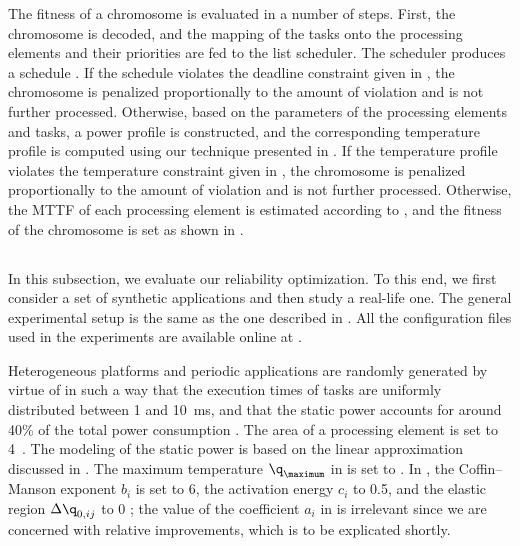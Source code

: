 The fitness of a chromosome is evaluated in a number of steps. First, the
chromosome is decoded, and the mapping of the tasks onto the processing elements
and their priorities are fed to the list scheduler. The scheduler produces a
schedule \schedule. If the schedule violates the deadline constraint given in
, the chromosome is penalized proportionally
to the amount of violation and is not further processed. Otherwise, based on the
parameters of the processing elements and tasks, a power profile \mp is
constructed, and the corresponding temperature profile \mq is computed using our
technique presented in . If the temperature
profile violates the temperature constraint given in
, the chromosome is penalized proportionally
to the amount of violation and is not further processed. Otherwise, the
\ac{MTTF} of each processing element is estimated according to
, and the fitness of the chromosome is set as
shown in .

\subsection{\resultstitle}

In this subsection, we evaluate our reliability optimization. To this end, we
first consider a set of synthetic applications and then study a real-life one.
The general experimental setup is the same as the one described in
. All the configuration files used in the
experiments are available online at \cite{eslab2012}.

Heterogeneous platforms and periodic applications are randomly generated by
virtue of  \cite{dick1998} in such a way that the execution times of
tasks are uniformly distributed between 1 and 10~ms, and that the static power
accounts for around 40\% of the total power consumption \cite{liu2007}. The area
of a processing element is set to 4~. The modeling of the static
power is based on the linear approximation discussed in
. The maximum temperature $\q_\maximum$ in
 is set to . In
, the Coffin--Manson exponent $b_i$ is set to
6, the activation energy $c_i$ to 0.5, and the elastic region $\Delta \q_{0,
ij}$ to 0 \cite{jedec2016}; the value of the coefficient $a_i$ in
 is irrelevant since we are concerned with
relative improvements, which is to be explicated shortly.

